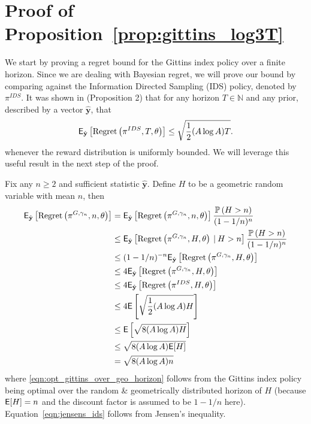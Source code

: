 \section{Proof of Proposition~\ref{prop:gittins_log3T}} \label{proof:prop_log3T}
\begin{myproof}[Proof.]
	We start by proving a regret bound for the Gittins index policy over a finite horizon.
	Since we are dealing with Bayesian regret, we will prove our bound by comparing against the Information Directed Sampling (IDS) policy, denoted by $\pi^{IDS}$. It was shown in \citep{russo2014learning} (Proposition 2) that for any horizon $T \in \mathbb N$ and any prior, described by a vector $\hat{\mathbf y}$, that
	\[
	\mathsf{E}_{\hat{\mathbf y}}\left[ \textnormal{Regret} \left( \pi^{IDS}, T, \theta \right) \right] 
	 \le  \sqrt{\frac{1}{2} (A \log A) T}.
	\]
	whenever the reward distribution is uniformly bounded.
	We will leverage this useful result in the next step of the proof.
	
	Fix any $n \ge 2$ and sufficient statistic $\hat{\mathbf y}$. Define $H$ to be a geometric random variable with mean $n$, then	
	\begin{align}
	\mathsf{E}_{\hat{\mathbf y}}\left[\textnormal{Regret} \left( \pi^{G, \gamma_n}, n, \theta \right)\right]  & = \mathsf{E}_{\hat{\mathbf y}}\left[\textnormal{Regret} \left( \pi^{G, \gamma_n}, n, \theta \right)\right]\frac{\mathbb{P} \left( H > n \right)}{(1 - 1/n)^n} \nonumber \\
	&  \le  \mathsf{E}_{\hat{\mathbf y}}\left[\textnormal{Regret} \left( \pi^{G, \gamma_n}, H, \theta \right) \:\vert\: H > n\right]\frac{\mathbb{P} \left( H > n \right) }{(1 - 1/n)^n} \nonumber\\
	& \le  (1 - 1/n)^{-n}  \mathsf{E}_{\hat{\mathbf y}}\left[ \textnormal{Regret} \left( \pi^{G,\gamma_n}, H, \theta \right) \right] \nonumber   \\
	& \le  4 \mathsf{E}_{\hat{\mathbf y}}\left[ \textnormal{Regret} \left( \pi^{G,\gamma_n}, H, \theta \right) \right]   \nonumber \\
	& \le 4\mathsf{E}_{\hat{\mathbf y}}\left[ \textnormal{Regret} \left( \pi^{IDS}, H, \theta \right) \right] \label{eqn:opt_gittins_over_geo_horizon} \\
	& \le 4 \mathsf{E}\left[  \sqrt{\frac{1}{2} (A \log A) H} \right] \nonumber\\
	& \le  \mathsf{E}\left[  \sqrt{8 (A \log A) H} \right] \nonumber \\
	& \le  \sqrt{8 (A \log A) \mathsf{E}[H]}  \label{eqn:jensens_ids} \\
	& =  \sqrt{8 (A \log A) n} \label{eqn:regret_bound_for_ids}   
	\end{align}
	where \eqref{eqn:opt_gittins_over_geo_horizon} follows from the Gittins index policy being optimal over the random \& geometrically distributed horizon of $H$ (because $\mathsf{E}[H] = n$ and the discount factor is assumed to be $1 - 1/n$ here). Equation~\eqref{eqn:jensens_ids} follows from Jensen's inequality.
	

\end{myproof}
